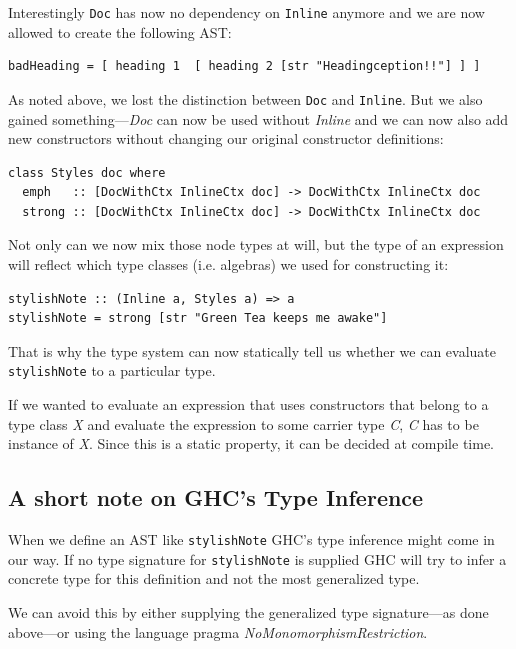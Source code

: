 Interestingly \texttt{Doc} has now no dependency on \texttt{Inline} anymore and
we are now allowed to create the following AST:

\begin{lstlisting}
badHeading = [ heading 1  [ heading 2 [str "Headingception!!"] ] ]
\end{lstlisting}

As noted above, we lost the distinction between \texttt{Doc} and
\texttt{Inline}. But we also gained something—\emph{Doc} can now be used
without \emph{Inline} and we can now also add new constructors without changing our
original constructor definitions:

\begin{lstlisting}
class Styles doc where
  emph   :: [DocWithCtx InlineCtx doc] -> DocWithCtx InlineCtx doc
  strong :: [DocWithCtx InlineCtx doc] -> DocWithCtx InlineCtx doc
\end{lstlisting}

Not only can we now mix those node types at will, but the type of an expression
will reflect which type classes (i.e. algebras) we used for constructing it:

\begin{lstlisting}
stylishNote :: (Inline a, Styles a) => a
stylishNote = strong [str "Green Tea keeps me awake"]
\end{lstlisting}

That is why the type system can now statically tell us whether we can evaluate
\texttt{stylishNote} to a particular type.

If we wanted to evaluate an expression that uses constructors that belong to a
type class \emph{X} and evaluate the expression to some carrier type \emph{C},
\emph{C} has to be instance of \emph{X}. Since this is a static property, it can
be decided at compile time.

\subsection{A short note on GHC’s Type Inference}

When we define an AST like \texttt{stylishNote} GHC’s type inference might come
in our way. If no type signature for \texttt{stylishNote} is supplied GHC will
try to infer a concrete type for this definition and not the most generalized
type.

We can avoid this by either supplying the generalized type signature—as done
above—or using the language pragma \emph{NoMonomorphismRestriction}.

